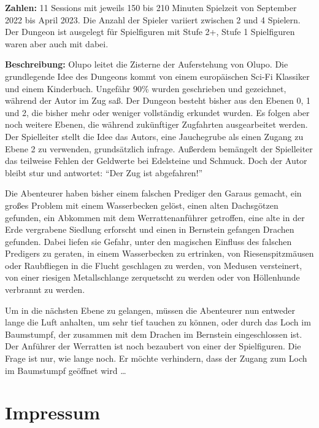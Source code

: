 \documentclass[11pt]{wbzine}
\begin{document}
\begin{multicols}{2}
\textbf{Zahlen:} 11 Sessions mit jeweils 150 bis 210 Minuten Spielzeit von
September 2022 bis April 2023. Die Anzahl der Spieler variiert zwischen
2 und 4 Spielern. Der Dungeon ist ausgelegt für Spielfiguren mit Stufe
2+, Stufe 1 Spielfiguren waren aber auch mit dabei.

\textbf{Beschreibung:} Olupo leitet die Zisterne der Auferstehung von
Olupo. Die grundlegende Idee des Dungeons kommt von einem europäischen
Sci-Fi Klassiker und einem Kinderbuch. Ungefähr 90\% wurden geschrieben
und gezeichnet, während der Autor im Zug saß. Der Dungeon besteht bisher
aus den Ebenen 0, 1 und 2, die bisher mehr oder weniger vollständig
erkundet wurden. Es folgen aber noch weitere Ebenen, die während 
zukünftiger Zugfahrten ausgearbeitet werden. Der Spielleiter stellt
die Idee das Autors, eine Jauchegrube als einen Zugang zu Ebene 2 zu
verwenden, grundsätzlich infrage. Außerdem bemängelt der Spielleiter
das teilweise Fehlen der Geldwerte bei Edelsteine und Schmuck. Doch der
Autor bleibt stur und antwortet: ``Der Zug ist abgefahren!''

Die Abenteurer haben bisher einem falschen Prediger den Garaus gemacht,
ein großes Problem mit einem Wasserbecken gelöst, einen alten
Dachsgötzen gefunden, ein Abkommen mit dem Werrattenanführer getroffen,
eine alte in der Erde vergrabene Siedlung erforscht und einen in Bernstein
gefangen Drachen gefunden. Dabei liefen sie Gefahr, unter den magischen
Einfluss des falschen Predigers zu geraten, in einem Wasserbecken
zu ertrinken, von Riesenspitzmäusen oder Raubfliegen in die Flucht
geschlagen zu werden, von Medusen versteinert, von einer riesigen
Metallschlange zerquetscht zu werden oder von Höllenhunde verbrannt
zu werden.

Um in die nächsten Ebene zu gelangen, müssen die Abenteurer nun
entweder lange die Luft anhalten, um sehr tief tauchen zu können, oder
durch das Loch im Baumstumpf, der zusammen mit dem Drachen im Bernstein
eingeschlossen ist. Der Anführer der Werratten ist noch bezaubert von
einer der Spielfiguren. Die Frage ist nur, wie lange noch. Er möchte
verhindern, dass der Zugang zum Loch im Baumstumpf geöffnet
wird \dots{}





\end{multicols}




\section{Impressum}
\end{document}
